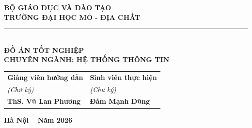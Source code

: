 \begin{titlepage}
\vspace*{0.2cm}
\begin{center}
  {\fontsize{16pt}{20pt}\selectfont \textbf{BỘ GIÁO DỤC VÀ ĐÀO TẠO}} \\[0.25cm]
  {\fontsize{16pt}{20pt}\selectfont \textbf{TRƯỜNG ĐẠI HỌC MỎ - ĐỊA CHẤT}} \\[0.25cm]
  \rule{6.5cm}{1.0pt} \\[2.5cm]

  {\fontsize{36pt}{42pt}\selectfont \textbf{ĐỒ ÁN TỐT NGHIỆP}} \\[1.5cm]

  {\fontsize{16pt}{20pt}\selectfont \textbf{CHUYÊN NGÀNH: HỆ THỐNG THÔNG TIN}} \\[2.8cm]

  \begin{tabular}{>{\centering\arraybackslash}p{6.8cm} >{\centering\arraybackslash}p{7.2cm}}
    \fontsize{14pt}{18pt}\selectfont \textbf{Giảng viên hướng dẫn} & \fontsize{14pt}{18pt}\selectfont \textbf{Sinh viên thực hiện} \\[0.3cm]
    \fontsize{13pt}{17pt}\selectfont \textit{(Chữ ký)} & \fontsize{13pt}{17pt}\selectfont \textit{(Chữ ký)} \\[2.2cm]
    \fontsize{15pt}{19pt}\selectfont \textbf{ThS. Vũ Lan Phương} & \fontsize{15pt}{19pt}\selectfont \textbf{Đàm Mạnh Dũng} \\
  \end{tabular}

  \vfill

  {\fontsize{16pt}{20pt}\selectfont \textbf{Hà Nội -- Năm 2026}}
  \vspace*{0.3cm}
\end{center}
\end{titlepage}
